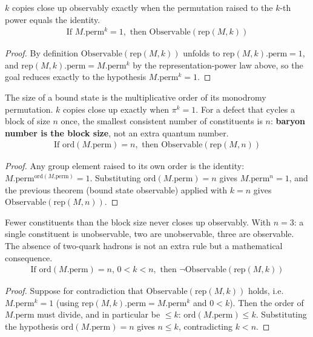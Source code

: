 \begin{theorem}
$k$ copies close up observably exactly when the permutation raised to the $k$-th power equals the identity.
\begin{align*}
\text{If } M.\text{perm}^k = 1, \text{ then } \text{Observable}(\text{rep}(M, k))
\end{align*}
\begin{proof}
By definition $\text{Observable}(\text{rep}(M,k))$ unfolds to
$\text{rep}(M,k).\text{perm}=1$, and $\text{rep}(M,k).\text{perm}=M.\text{perm}^k$
by the representation-power law above, so the goal reduces exactly to the
hypothesis $M.\text{perm}^k=1$.
\end{proof}
\end{theorem}

\begin{theorem}
The size of a bound state is the multiplicative order of its monodromy permutation.  $k$ copies close up exactly when $\pi^k = 1$.  For a defect that cycles a block of size $n$ once, the smallest consistent number of constituents is $n$: \textbf{baryon number is the block size}, not an extra quantum number.
\begin{align*}
\text{If } \text{ord}(M.\text{perm}) = n, \text{ then } \text{Observable}(\text{rep}(M, n))
\end{align*}
\begin{proof}
Any group element raised to its own order is the identity:
$M.\text{perm}^{\text{ord}(M.\text{perm})}=1$. Substituting $\text{ord}(M.\text{perm})=n$
gives $M.\text{perm}^n=1$, and the previous theorem (bound state observable)
applied with $k=n$ gives $\text{Observable}(\text{rep}(M,n))$.
\end{proof}
\end{theorem}

\begin{theorem}
Fewer constituents than the block size never closes up observably.  With $n = 3$: a single constituent is unobservable, two are unobservable, three are observable.  The absence of two-quark hadrons is not an extra rule but a mathematical consequence.
\begin{align*}
\text{If } \text{ord}(M.\text{perm}) = n, \, 0 < k < n, \text{ then } \neg \text{Observable}(\text{rep}(M, k))
\end{align*}
\begin{proof}
Suppose for contradiction that $\text{Observable}(\text{rep}(M,k))$ holds, i.e.
$M.\text{perm}^k=1$ (using $\text{rep}(M,k).\text{perm}=M.\text{perm}^k$ and
$0<k$). Then the order of $M.\text{perm}$ must divide, and in particular be
$\leq k$: $\text{ord}(M.\text{perm}) \leq k$. Substituting the hypothesis
$\text{ord}(M.\text{perm})=n$ gives $n \leq k$, contradicting $k<n$.
\end{proof}
\end{theorem}

